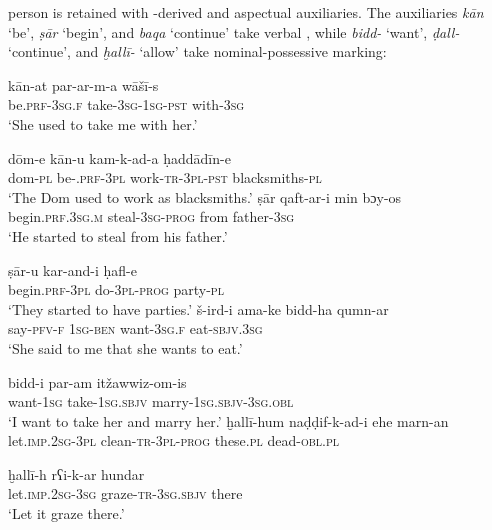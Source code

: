 \documentclass[output=paper]{langsci/langscibook}
\begin{document}
 person   is retained with -derived  and aspectual auxiliaries. The auxiliaries \textit{kān} ‘be’, \textit{ṣār} ‘begin’, and \textit{baqa} ‘continue’ take  verbal , while \textit{bidd-} ‘want’, \textit{ḍall-} ‘continue’, and \textit{ḫallī-} ‘allow’ take  nominal-possessive marking:

\ea
\ea
\gll kān-at           par-ar-m-a        wāšī-s  \\
     be.\textsc{prf-3sg.f}   take-\textsc{3sg-1sg-pst}  with-\textsc{3sg}\\
\glt ‘She used to take me with her.’

\ex
\gll dōm-e kān-u kam-k-ad-a  {ḥ}addādīn-e\\
     dom-\textsc{pl} be-\textsc{.prf-3pl} work-\textsc{tr-3pl-pst} blacksmiths-\textsc{pl}\\
\glt ‘The Dom used to work as blacksmiths.’
\z
\ex
\ea
\gll ṣār  qaft-ar-i  min  b{ɔ}y-os\\
     begin.\textsc{prf.3sg.m} steal-\textsc{3sg-prog} from father-\textsc{3sg}\\
\glt ‘He started to steal from his father.’

\ex
\gll ṣār-u  kar-and-i  ḥafl-e\\
     begin.\textsc{prf-3pl} do-\textsc{3pl}-\textsc{prog}  party-\textsc{pl}\\
\glt ‘They started to have parties.’
\z
\ex
\ea
\gll š-ird-i  ama-ke bidd-ha qumn-ar\\
     say-\textsc{pfv-f} \textsc{1sg-ben} want-\textsc{3sg.f} eat-\textsc{sbjv.3sg}\\
\glt ‘She said to me that she wants to eat.’

\ex
\gll bidd-i  par-am itžawwiz-om-is\\
     want-\textsc{1sg} take-\textsc{1sg.sbjv} marry-\textsc{1sg.sbjv-3sg.obl}\\
\glt ‘I want to take her and marry her.’
\z
\ex
\ea
\gll ḫallī-hum naḍḍif-k-ad-i ehe marn-an  \\
     let.\textsc{imp.2sg-3pl} clean-\textsc{tr-3pl-prog} these.\textsc{pl} dead-\textsc{obl.pl}\\

\ex
\gll ḫallī-h rʕi-k-ar hundar\\
     let.\textsc{imp.2sg}-\textsc{3sg} graze-\textsc{tr-3sg.sbjv} there\\
\glt ‘Let it graze there.’
\z
\z
\end{document}
